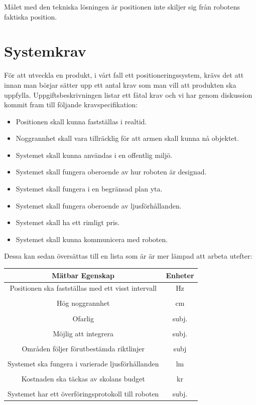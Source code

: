 \documentclass[11pt, a4paper]{report}
\begin{document}
Målet med den tekniska lösningen är positionen inte skiljer sig från robotens faktiska position.

\section{Systemkrav}
För att utveckla en produkt, i vårt fall ett positioneringssystem, krävs det att innan man börjar sätter upp ett antal krav som man vill att produkten ska uppfylla. Uppgiftsbeskrivningen listar ett fåtal krav och vi har genom diskussion kommit fram till följande kravspecifikation:
\begin{itemize}
\item Positionen skall kunna fastställas i realtid.
\item Noggrannhet skall vara tillräcklig för att armen skall kunna nå objektet.
\item Systemet skall kunna användas i en offentlig miljö.
\item Systemet skall fungera oberoende av hur roboten är designad.
\item Systemet skall fungera i en begränsad plan yta.
\item Systemet skall fungera oberoende av ljusförhållanden.
\item Systemet skall ha ett rimligt pris.
\item Systemet skall kunna kommunicera med roboten.

\end{itemize}
 Dessa kan sedan översättas till en lista som är är mer lämpad att arbeta utefter:
 \begin{center}
     \begin{tabular}{ c | c}
     	Mätbar Egenskap & Enheter  \\ \hline
  		Positionen ska fastställas med ett visst intervall & Hz  \\ \\
        Hög noggrannhet & cm\\ \\ 
        Ofarlig & subj. \\ \\
        Möjlig att integrera & subj.\\ \\
        Områden följer förutbestämda riktlinjer & subj\\ \\
        Systemet ska fungera i varierade ljusförhållanden & lm\\ \\
        Kostnaden ska täckas av skolans budget & kr  \\ \\
        Systemet har ett överföringsprotokoll till roboten & subj.\\ 

  \end{tabular}
  \end{center}
\end{document}
